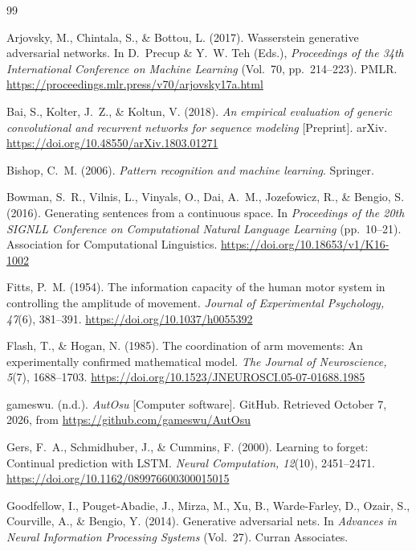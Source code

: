 \begingroup
\setlength{\bibsep}{4pt}
\setlength{\bibhang}{0.5in}
\small
\begin{thebibliography}{99}

Arjovsky, M., Chintala, S., \& Bottou, L. (2017). Wasserstein generative adversarial networks. In D.~Precup \&
Y.~W. Teh (Eds.), \emph{Proceedings of the 34th International Conference on Machine Learning} (Vol.~70,
pp.~214--223). PMLR. \url{https://proceedings.mlr.press/v70/arjovsky17a.html}

Bai, S., Kolter, J.~Z., \& Koltun, V. (2018). \emph{An empirical evaluation of generic convolutional and
recurrent networks for sequence modeling} [Preprint]. arXiv. \url{https://doi.org/10.48550/arXiv.1803.01271}

Bishop, C.~M. (2006). \emph{Pattern recognition and machine learning}. Springer.

Bowman, S.~R., Vilnis, L., Vinyals, O., Dai, A.~M., Jozefowicz, R., \& Bengio, S. (2016). Generating sentences
from a continuous space. In \emph{Proceedings of the 20th SIGNLL Conference on Computational Natural Language
Learning} (pp.~10--21). Association for Computational Linguistics. \url{https://doi.org/10.18653/v1/K16-1002}

Fitts, P.~M. (1954). The information capacity of the human motor system in controlling the amplitude of
movement. \emph{Journal of Experimental Psychology, 47}(6), 381--391. \url{https://doi.org/10.1037/h0055392}

Flash, T., \& Hogan, N. (1985). The coordination of arm movements: An experimentally confirmed mathematical
model. \emph{The Journal of Neuroscience, 5}(7), 1688--1703.
\url{https://doi.org/10.1523/JNEUROSCI.05-07-01688.1985}

gameswu. (n.d.). \emph{AutOsu} [Computer software]. GitHub. Retrieved October 7, 2026, from
\url{https://github.com/gameswu/AutOsu}

Gers, F.~A., Schmidhuber, J., \& Cummins, F. (2000). Learning to forget: Continual prediction with LSTM.
\emph{Neural Computation, 12}(10), 2451--2471. \url{https://doi.org/10.1162/089976600300015015}

Goodfellow, I., Pouget-Abadie, J., Mirza, M., Xu, B., Warde-Farley, D., Ozair, S., Courville, A., \& Bengio, Y.
(2014). Generative adversarial nets. In \emph{Advances in Neural Information Processing Systems} (Vol.~27).
Curran Associates.


\end{thebibliography}
